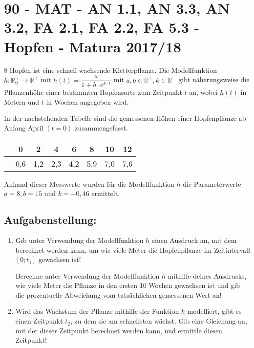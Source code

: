 \section{90 - MAT - AN 1.1, AN 3.3, AN 3.2, FA 2.1, FA 2.2, FA 5.3 - Hopfen - Matura 2017/18}

\begin{langesbeispiel} \item[8] %
			Hopfen ist eine schnell wachsende Kletterpflanze. Die Modellfunktion $h:\mathbb{R}^+_0\rightarrow\mathbb{R}^+$ mit $h(t)=\dfrac{a}{1+b\cdot e^{k\cdot t}}$ mit $a,b\in\mathbb{R}^+, k\in\mathbb{R}^-$ gibt näherungsweise die Pflanzenhöhe einer bestimmten Hopfensorte zum Zeitpunkt $t$ an, wobei $h(t)$ in Metern und $t$ in Wochen angegeben wird.
			
			In der nachstehenden Tabelle sind die gemessenen Höhen einer Hopfenpflanze ab Anfang April $(t=0)$ zusammengefasst.
			
			\begin{center}
				\begin{tabular}{|l|c|c|c|c|c|c|c|}\hline
				\cellcolor[gray]{0.9}{Zeit (in Wochen)}&0&2&4&6&8&10&12\\ \hline
				\cellcolor[gray]{0.9}{Höhe (in m)}&0,6&1,2&2,3&4,2&5,9&7,0&7,6\\ \hline
				\end{tabular}
			\end{center}
			
Anhand dieser Messwerte wurden für die Modellfunktion $h$ die Parameterwerte $a=8, b=15$ und $k=-0,46$ ermittelt.

\subsection{Aufgabenstellung:}
\begin{enumerate}
	\item {} Gib unter Verwendung der Modellfunktion $h$ einen Ausdruck an, mit dem berechnet werden kann, um wie viele Meter die Hopfenpflanze im Zeitintervall $[0;t_1]$ gewachsen ist!
	
	Berechne unter Verwendung der Modellfunktion $h$ mithilfe deines Ausdrucks, wie viele Meter die Pflanze in den ersten 10 Wochen gewachsen ist und gib die prozentuelle Abweichung vom tatsächlichen gemessenen Wert an!
	
	\item Wird das Wachstum der Pflanze mithilfe der Funktion $h$ modelliert, gibt es einen Zeitpunkt $t_2$, zu dem sie am schnellsten wächst. Gib eine Gleichung an, mit der dieser Zeitpunkt berechnet werden kann, und ermittle diesen Zeitpunkt!
	

\end{enumerate}
\end{langesbeispiel}
